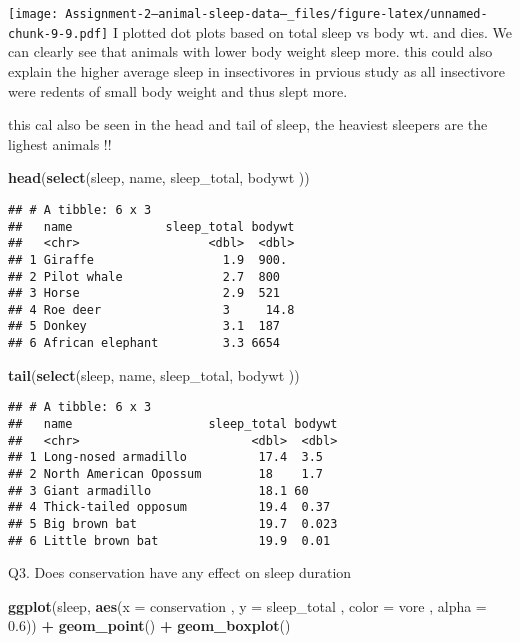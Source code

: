 \documentclass[
]{article}
\newenvironment{Shaded}{\begin{snugshade}}{\end{snugshade}}
\newcommand{\AttributeTok}[1]{\textcolor[rgb]{0.13,0.29,0.53}{#1}}
\newcommand{\FloatTok}[1]{\textcolor[rgb]{0.00,0.00,0.81}{#1}}
\newcommand{\FunctionTok}[1]{\textcolor[rgb]{0.13,0.29,0.53}{\textbf{#1}}}
\newcommand{\NormalTok}[1]{#1}
\newcommand{\SpecialCharTok}[1]{\textcolor[rgb]{0.81,0.36,0.00}{\textbf{#1}}}
\begin{document}
\texttt{[image: Assignment-2---animal-sleep-data--\_files/figure-latex/unnamed-chunk-9-9.pdf]}
I plotted dot plots based on total sleep vs body wt. and dies. We can
clearly see that animals with lower body weight sleep more. this could
also explain the higher average sleep in insectivores in prvious study
as all insectivore were redents of small body weight and thus slept
more.

this cal also be seen in the head and tail of sleep, the heaviest
sleepers are the lighest animals !!

\begin{Shaded}
\begin{Highlighting}[]
\FunctionTok{head}\NormalTok{(}\FunctionTok{select}\NormalTok{(sleep, name, sleep\_total, bodywt ))}
\end{Highlighting}
\end{Shaded}

\begin{verbatim}
## # A tibble: 6 x 3
##   name             sleep_total bodywt
##   <chr>                  <dbl>  <dbl>
## 1 Giraffe                  1.9  900. 
## 2 Pilot whale              2.7  800  
## 3 Horse                    2.9  521  
## 4 Roe deer                 3     14.8
## 5 Donkey                   3.1  187  
## 6 African elephant         3.3 6654
\end{verbatim}

\begin{Shaded}
\begin{Highlighting}[]
\FunctionTok{tail}\NormalTok{(}\FunctionTok{select}\NormalTok{(sleep, name, sleep\_total, bodywt ))}
\end{Highlighting}
\end{Shaded}

\begin{verbatim}
## # A tibble: 6 x 3
##   name                   sleep_total bodywt
##   <chr>                        <dbl>  <dbl>
## 1 Long-nosed armadillo          17.4  3.5  
## 2 North American Opossum        18    1.7  
## 3 Giant armadillo               18.1 60    
## 4 Thick-tailed opposum          19.4  0.37 
## 5 Big brown bat                 19.7  0.023
## 6 Little brown bat              19.9  0.01
\end{verbatim}

Q3. Does conservation have any effect on sleep duration

\begin{Shaded}
\begin{Highlighting}[]
\FunctionTok{ggplot}\NormalTok{(sleep, }\FunctionTok{aes}\NormalTok{(}\AttributeTok{x =}\NormalTok{ conservation , }\AttributeTok{y =}\NormalTok{ sleep\_total , }\AttributeTok{color =}\NormalTok{ vore , }\AttributeTok{alpha =} \FloatTok{0.6}\NormalTok{)) }\SpecialCharTok{+} \FunctionTok{geom\_point}\NormalTok{() }\SpecialCharTok{+} \FunctionTok{geom\_boxplot}\NormalTok{()}
\end{Highlighting}
\end{Shaded}
\end{document}
